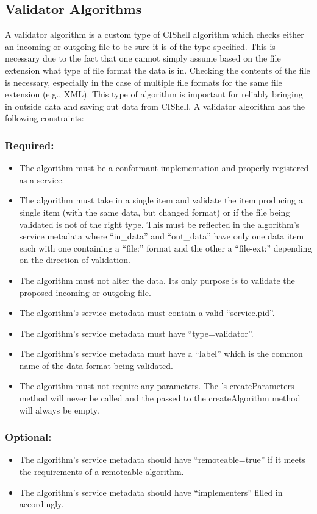 \subsection{Validator Algorithms}

A validator algorithm is a custom type of CIShell algorithm which checks either
an incoming or outgoing file to be sure it is of the type specified. This is
necessary due to the fact that one cannot simply assume based on the file
extension what type of file format the data is in. Checking the contents of the
file is necessary, especially in the case of multiple file formats for the same
file extension (e.g., XML). This type of algorithm is important for reliably
bringing in outside data and saving out data from CIShell. A validator algorithm
has the following constraints:

\subsubsection*{Required:}
\begin{itemize}
  \item The algorithm must be a conformant 
  implementation and properly registered as a service.
  \item The algorithm must take in a single  item and validate the
  item producing a single  item (with the same data, but changed
  format) or  if the file being validated is not of the right
  type. This must be reflected in the algorithm's service metadata where
  ``in\_data'' and ``out\_data'' have only one data item each with one
  containing a ``file:'' format and the other a ``file-ext:'' depending on the 
  direction of validation.
  \item The algorithm must not alter the data. Its only purpose is to validate
  the proposed incoming or outgoing file.
  \item The algorithm's service metadata must contain a valid ``service.pid''.
  \item The algorithm's service metadata must have ``type=validator''.
  \item The algorithm's service metadata must have a ``label'' which is the
  common name of the data format being validated.
  \item The algorithm must not require any parameters. The
  's createParameters method will never be called and
  the  passed to the createAlgorithm method will always be
  empty.
\end{itemize}

\subsubsection*{Optional:}
\begin{itemize}
  \item The algorithm's service metadata should have ``remoteable=true'' if it
  meets the requirements of a remoteable algorithm.
  \item The algorithm's service metadata should have ``implementers'' filled
  in accordingly.
\end{itemize}
